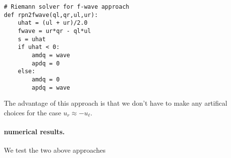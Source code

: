 \documentclass{article}
\begin{document}
\vspace{0.25cm}

\begin{minipage}{\textwidth}
\begin{verbatim}
# Riemann solver for f-wave approach
def rpn2fwave(ql,qr,ul,ur):
    uhat = (ul + ur)/2.0
    fwave = ur*qr - ql*ul
    s = uhat
    if uhat < 0:
        amdq = wave
        apdq = 0
    else:
        amdq = 0
        apdq = wave
\end{verbatim}
\end{minipage}

\vspace{0.25cm}

\noindent
The advantage of this approach is that we don't have to make any artifical choices for the case $u_r \approx -u_\ell$.  

\paragraph{numerical results.}  We test the two above approaches



\end{document}
